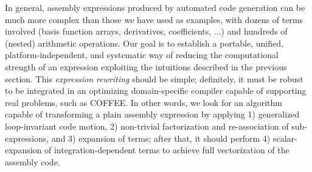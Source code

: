 In general, assembly expressions produced by automated code generation can be much more complex than those we have used as examples, with dozens of terms involved (basis function arrays, derivatives, coefficients, ...) and hundreds of (nested) arithmetic operations. Our goal is to establish a portable, unified, platform-independent, and systematic way of reducing the computational strength of an expression exploiting the intuitions described in the previous section. This \textit{expression rewriting} should be simple; definitely, it must be robust to be integrated in an optimizing domain-specific compiler capable of supporting real problems, such as COFFEE. In other words, we look for an algorithm capable of transforming a plain assembly expression by applying 1) generalized loop-invariant code motion, 2) non-trivial factorization and re-association of sub-expressions, and 3) expansion of terms; after that, it should perform 4) scalar-expansion of integration-dependent terms to achieve full vectorization of the assembly code. 


